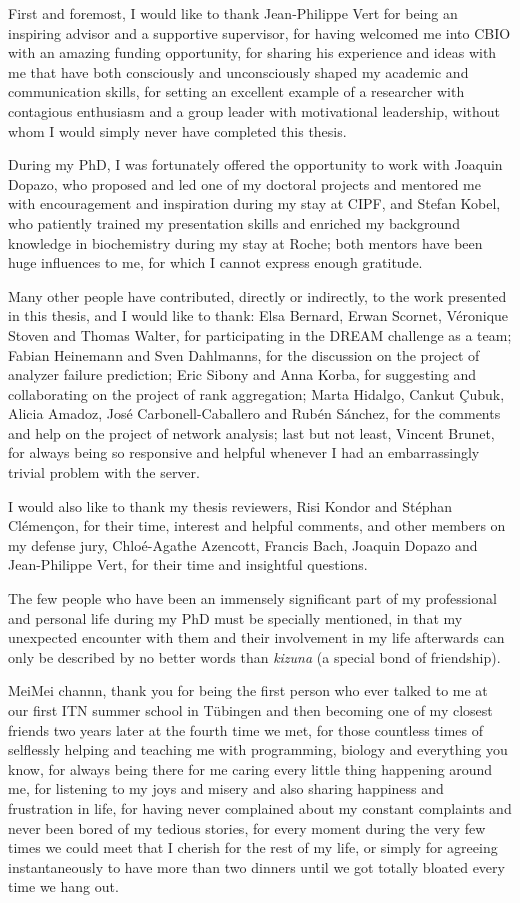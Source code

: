 First and foremost, I would like to thank Jean-Philippe Vert for being an inspiring advisor and a supportive supervisor, for having welcomed me into CBIO with an amazing funding opportunity, for sharing his experience and ideas with me that have both consciously and unconsciously shaped my academic and communication skills, for setting an excellent example of a researcher with contagious enthusiasm and a group leader with motivational leadership, without whom I would simply never have completed this thesis.


During my PhD, I was fortunately offered the opportunity to work with Joaquin Dopazo, who proposed and led one of my doctoral projects and mentored me with encouragement and inspiration during my stay at CIPF, and Stefan Kobel, who patiently trained my presentation skills and enriched my background knowledge in biochemistry during my stay at Roche; both mentors have been huge influences to me, for which I cannot express enough gratitude.


Many other people have contributed, directly or indirectly, to the work presented in this thesis, and I would like to thank: Elsa Bernard, Erwan Scornet, V\'{e}ronique Stoven and Thomas Walter, for participating in the DREAM challenge as a team; Fabian Heinemann and Sven Dahlmanns, for the discussion on the project of analyzer failure prediction; Eric Sibony and Anna Korba, for suggesting and collaborating on the project of rank aggregation; Marta Hidalgo, Cankut \c{C}ubuk, Alicia Amadoz, Jos\'{e} Carbonell-Caballero and Rub\'{e}n S\'{a}nchez, for the comments and help on the project of network analysis; last but not least, Vincent Brunet, for always being so responsive and helpful whenever I had an embarrassingly trivial problem with the server.


I would also like to thank my thesis reviewers, Risi Kondor and St\'{e}phan Cl\'{e}men\c{c}on, for their time, interest and helpful comments, and other members on my defense jury, Chlo\'{e}-Agathe Azencott, Francis Bach, Joaquin Dopazo and Jean-Philippe Vert, for their time and insightful questions.


The few people who have been an immensely significant part of my professional and personal life during my PhD must be specially mentioned, in that my unexpected encounter with them and their involvement in my life afterwards can only be described by no better words than \textit{kizuna} (a special bond of friendship).


MeiMei channn, thank you for being the first person who ever talked to me at our first ITN summer school in T\"{u}bingen and then becoming one of my closest friends two years later at the fourth time we met, for those countless times of selflessly helping and teaching me with programming, biology and everything you know, for always being there for me caring every little thing happening around me, for listening to my joys and misery and also sharing happiness and frustration in life, for having never complained about my constant complaints and never been bored of my tedious stories, for every moment during the very few times we could meet that I cherish for the rest of my life, or simply for agreeing instantaneously to have more than two dinners until we got totally bloated every time we hang out.


